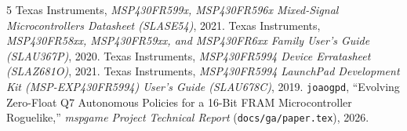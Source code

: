 \documentclass[conference]{IEEEtran}
\begin{document}
\begin{thebibliography}{5}
 Texas Instruments, \emph{MSP430FR599x, MSP430FR596x Mixed-Signal Microcontrollers Datasheet (SLASE54)}, 2021.
 Texas Instruments, \emph{MSP430FR58xx, MSP430FR59xx, and MSP430FR6xx Family User's Guide (SLAU367P)}, 2020.
 Texas Instruments, \emph{MSP430FR5994 Device Erratasheet (SLAZ681O)}, 2021.
 Texas Instruments, \emph{MSP430FR5994 LaunchPad Development Kit (MSP-EXP430FR5994) User's Guide (SLAU678C)}, 2019.
 \texttt{joaogpd}, ``Evolving Zero-Float Q7 Autonomous Policies for a 16-Bit FRAM Microcontroller Roguelike,'' \emph{mspgame Project Technical Report} (\texttt{docs/ga/paper.tex}), 2026.
\end{thebibliography}
\end{document}
